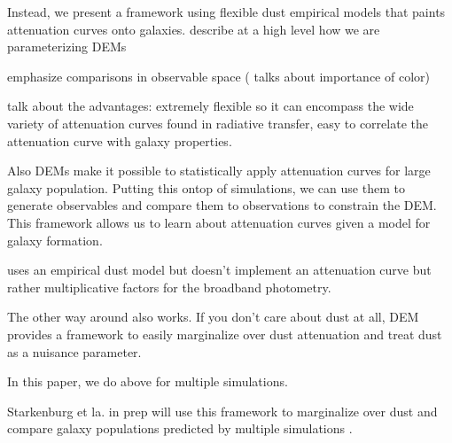 Instead, we present a framework using flexible dust empirical models that
paints attenuation curves onto galaxies. describe at a high level how we are
parameterizing DEMs 

emphasize comparisons in observable space (\cite{nelson2018} talks about
importance of color)

talk about the advantages: extremely flexible so it can encompass the wide variety of
attenuation curves found in radiative transfer, easy to correlate the
attenuation curve with galaxy properties. 

Also DEMs make it possible to statistically apply attenuation curves for large
galaxy population. Putting this ontop of simulations, we can use them to
generate observables and compare them to observations to constrain the DEM. 
This framework allows us to learn about attenuation curves given a model for 
galaxy formation. 


\cite{trayford2015} uses an empirical dust model but doesn't implement an
attenuation curve but rather multiplicative factors for the broadband
photometry.



The other way around also works. If you don't care about dust at all, DEM
provides a framework to easily marginalize over dust attenuation and treat dust
as a nuisance parameter. 

In this paper, we do above for multiple simulations. 

Starkenburg et la. in prep will use this framework to marginalize over dust and compare galaxy populations predicted by multiple
simulations . 


